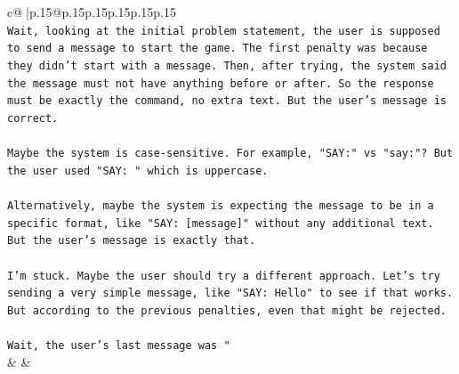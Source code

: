 \documentclass{article}
\begin{document}
{\begin{supertabular}{c@{$\;$}|p{.15\linewidth}@{}p{.15\linewidth}p{.15\linewidth}p{.15\linewidth}p{.15\linewidth}p{.15\linewidth}}
{{{\\ 
\texttt{Wait, looking at the initial problem statement, the user is supposed to send a message to start the game. The first penalty was because they didn't start with a message. Then, after trying, the system said the message must not have anything before or after. So the response must be exactly the command, no extra text. But the user's message is correct. } \\
\\ 
\texttt{Maybe the system is case{-}sensitive. For example, "SAY:" vs "say:"? But the user used "SAY: " which is uppercase. } \\
\\ 
\texttt{Alternatively, maybe the system is expecting the message to be in a specific format, like "SAY: {[}message{]}" without any additional text. But the user's message is exactly that. } \\
\\ 
\texttt{I'm stuck. Maybe the user should try a different approach. Let's try sending a very simple message, like "SAY: Hello" to see if that works. But according to the previous penalties, even that might be rejected. } \\
\\ 
\texttt{Wait, the user's last message was "} \\
            }
        }
    }
    & & \\ \\


\end{supertabular}}
\end{document}
